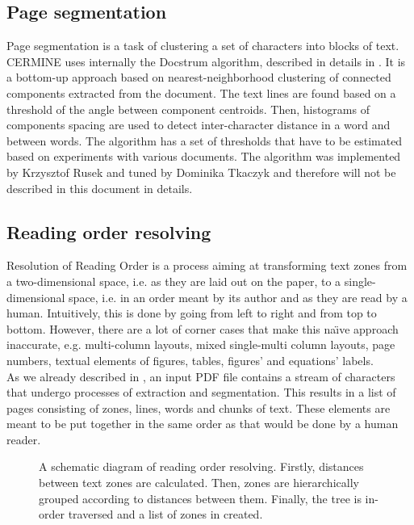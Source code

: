 \subsection{Page segmentation}\label{sec:page_segmentation}
Page segmentation is a task of clustering a set of characters into blocks of text. CERMINE uses internally the Docstrum algorithm, described in details in \cite{O'Gorman1993}. It is a bottom-up approach based on nearest-neighborhood clustering of connected components extracted from the document. The text lines are found based on a threshold of the angle between component centroids. Then, histograms of components spacing are used to detect inter-character distance in a word and between words. The algorithm has a set of thresholds that have to be estimated based on experiments with various documents. The algorithm was implemented by Krzysztof Rusek and tuned by Dominika Tkaczyk and therefore will not be described in this document in details.

\subsection{Reading order resolving}\label{sec:reading_order}
Resolution of Reading Order is a process aiming at transforming text zones from a two-dimensional space, i.e. as they are laid out on the paper, to a single-dimensional space, i.e. in an order meant by its author and as they are read by a human. Intuitively, this is done by going from left to right and from top to bottom. However, there are a lot of corner cases that make this na\"\i ve approach inaccurate, e.g. multi-column layouts, mixed single-multi column layouts, page numbers, textual elements of figures, tables, figures' and equations' labels.\\

As we already described in \cite{DominikaTkaczykPaweSzostekMateuszFedoryszakPiotrJanDendek2014}, an input PDF file contains a stream of characters that undergo processes of extraction and segmentation. This results in a list of pages consisting of zones, lines, words and chunks of text. These elements are meant to be put together in the same order as that would be done by a human reader.

\begin{figure}[ht!]
  \centering
  
  \caption{A schematic diagram of reading order resolving. Firstly, distances between text zones are calculated. Then, zones are hierarchically grouped according to distances between them. Finally, the tree is in-order traversed and a list of zones in created.}
  \label{fig:reading_order}
\end{figure}

